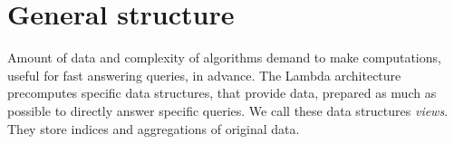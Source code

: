 \section{General structure}





Amount of data and complexity of algorithms demand to make computations, useful for fast answering queries, in advance.
The Lambda architecture precomputes specific data structures, that provide data, prepared as much as possible to directly answer specific queries.
We call these data structures \textit{views}.
They store indices and aggregations of original data.

